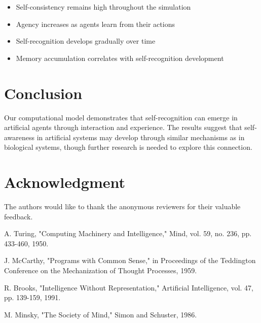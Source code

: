 \documentclass[conference]{IEEEtran}
\begin{document}
\begin{itemize}
    \item Self-consistency remains high throughout the simulation
    \item Agency increases as agents learn from their actions
    \item Self-recognition develops gradually over time
    \item Memory accumulation correlates with self-recognition development
\end{itemize}

\section{Conclusion}
Our computational model demonstrates that self-recognition can emerge in artificial agents through interaction and experience. The results suggest that self-awareness in artificial systems may develop through similar mechanisms as in biological systems, though further research is needed to explore this connection.

\section*{Acknowledgment}
The authors would like to thank the anonymous reviewers for their valuable feedback.

\begin{thebibliography}{1}
A. Turing, "Computing Machinery and Intelligence," Mind, vol. 59, no. 236, pp. 433-460, 1950.

J. McCarthy, "Programs with Common Sense," in Proceedings of the Teddington Conference on the Mechanization of Thought Processes, 1959.

R. Brooks, "Intelligence Without Representation," Artificial Intelligence, vol. 47, pp. 139-159, 1991.

M. Minsky, "The Society of Mind," Simon and Schuster, 1986.
\end{thebibliography}
\end{document}
